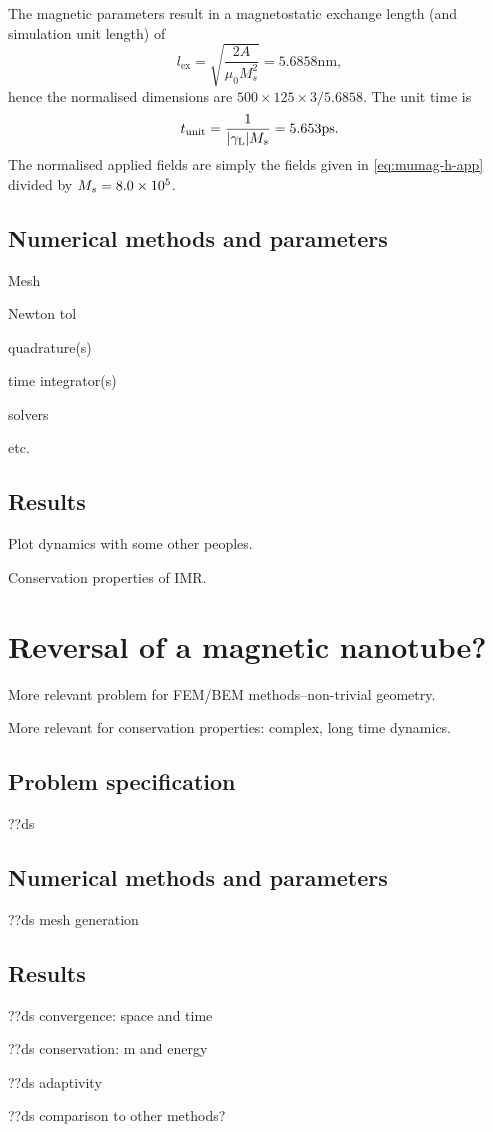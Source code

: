 The magnetic parameters result in a magnetostatic exchange length (and simulation unit length) of
\begin{equation}
  l_{\text{ex}} = \sqrt{\frac{2A}{\mu_0 M_s^2}} = 5.6858\text{nm},
\end{equation}
hence the normalised dimensions are $500 \times 125 \times 3 / 5.6858$.
The unit time is
\begin{equation}
  t_{\text{unit}} = \frac{1}{{\left|{\gamma_{\mathrm{\tiny{L}}}} \right|} M_s} = 5.653\text{ps}.
\end{equation}
The normalised applied fields are simply the fields given in \cref{eq:mumag-h-app} divided by $M_s = 8.0\times 10^{5}$.

\subsection{Numerical methods and parameters}

Mesh

Newton tol

quadrature(s)

time integrator(s)

solvers

etc.


\subsection{Results}

Plot dynamics with some other peoples.

Conservation properties of IMR.


\section{Reversal of a magnetic nanotube?}

More relevant problem for FEM/BEM methods--non-trivial geometry.

More relevant for conservation properties: complex, long time dynamics.


\subsection{Problem specification}

??ds


\subsection{Numerical methods and parameters}

??ds mesh generation



\subsection{Results}

??ds convergence: space and time


??ds conservation: m and energy


??ds adaptivity


??ds comparison to other methods?


